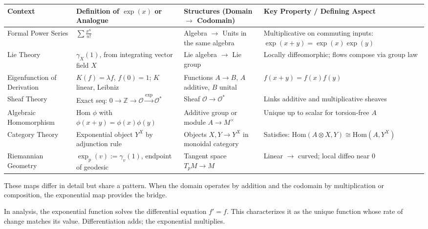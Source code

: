 \begin{center}
\renewcommand{\arraystretch}{1.5}
\setlength{\tabcolsep}{2pt}
\footnotesize
\begin{tabular}{|>{\centering\arraybackslash}m{2.0cm}|>{\centering\arraybackslash}m{2.8cm}|>{\centering\arraybackslash}m{3.8cm}|>{\centering\arraybackslash}m{4.2cm}|}
\hline
\textbf{Context} &
\textbf{Definition of \( \exp(x) \) or Analogue} &
\textbf{Structures (Domain \( \to \) Codomain)} &
\textbf{Key Property / Defining Aspect} \\
\hline
Formal Power Series &
\( \sum \frac{x^n}{n!} \) &
Algebra \( \to \) Units in the same algebra &
Multiplicative on commuting inputs: \( \exp(x+y) = \exp(x)\exp(y) \) \\
\hline
Lie Theory &
\( \gamma_X(1) \), from integrating vector field \( X \) &
Lie algebra \( \to \) Lie group &
Locally diffeomorphic; flows compose via group law \\
\hline
Eigenfunction of Derivation &
\( K(f) = \lambda f \), \( f(0) = 1 \); \( K \) linear, Leibniz &
Functions \( A \to B \), \( A \) additive, \( B \) unital &
\( f(x+y) = f(x)f(y) \) \\
\hline
Sheaf Theory &
Exact seq: \( 0 \to \mathbb{Z} \to \mathcal{O} \xrightarrow{\exp} \mathcal{O}^* \) &
Sheaf \( \mathcal{O} \to \mathcal{O}^* \) &
Links additive and multiplicative sheaves \\
\hline
Algebraic Homomorphism &
Hom \( \phi \) with \( \phi(x+y) = \phi(x)\phi(y) \) &
Additive group or module \( A \to M^\times \) &
Unique up to scalar for torsion-free \( A \) \\
\hline
Category Theory &
Exponential object \( Y^X \) by adjunction rule &
Objects \( X, Y \to Y^X \) in monoidal category &
Satisfies: \( \mathrm{Hom}(A \otimes X, Y) \cong \mathrm{Hom}(A, Y^X) \) \\
\hline
Riemannian Geometry &
\( \exp_p(v) := \gamma_v(1) \), endpoint of geodesic &
Tangent space \( T_p M \to M \) &
Linear \(\to\) curved; local diffeo near \( 0 \) \\
\hline
\end{tabular}
\end{center}

These maps differ in detail but share a pattern. When the domain operates by addition and the codomain by multiplication or composition, the exponential map provides the bridge.

In analysis, the exponential function solves the differential equation \( f' = f \). This characterizes it as the unique function whose rate of change matches its value. Differentiation adds; the exponential multiplies.

